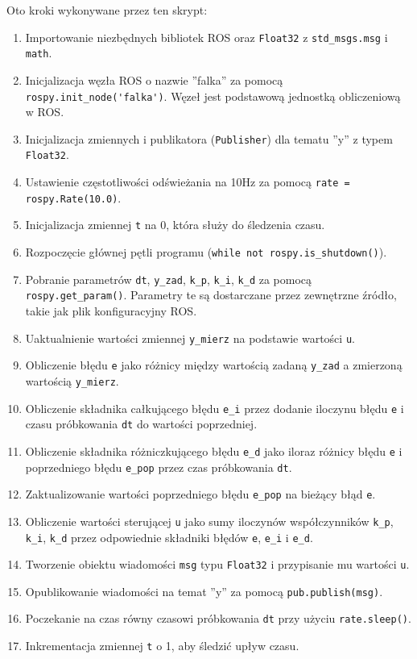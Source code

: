 \documentclass[10pt,a4paper,twoside,twocolumn]{article}%
\begin{document}
Oto kroki wykonywane przez ten skrypt:

\begin{enumerate}
    \item Importowanie niezbędnych bibliotek ROS oraz \verb|Float32| z \verb|std_msgs.msg| i \verb|math|.
    \item Inicjalizacja węzła ROS o nazwie ''falka'' za pomocą \verb|rospy.init_node('falka')|. Węzeł jest podstawową jednostką obliczeniową w ROS.
    \item Inicjalizacja zmiennych i publikatora (\verb|Publisher|) dla tematu ''y'' z typem \verb|Float32|.
    \item Ustawienie częstotliwości odświeżania na 10Hz za pomocą \verb|rate = rospy.Rate(10.0)|.
    \item Inicjalizacja zmiennej \verb|t| na 0, która służy do śledzenia czasu.
    \item Rozpoczęcie głównej pętli programu (\verb|while not rospy.is_shutdown()|).
    \item Pobranie parametrów \verb|dt|, \verb|y_zad|, \verb|k_p|, \verb|k_i|, \verb|k_d| za pomocą \verb|rospy.get_param()|. Parametry te są dostarczane przez zewnętrzne źródło, takie jak plik konfiguracyjny ROS.
    \item Uaktualnienie wartości zmiennej \verb|y_mierz| na podstawie wartości \verb|u|.
    \item Obliczenie błędu \verb|e| jako różnicy między wartością zadaną \verb|y_zad| a zmierzoną wartością \verb|y_mierz|.
    \item Obliczenie składnika całkującego błędu \verb|e_i| przez dodanie iloczynu błędu \verb|e| i czasu próbkowania \verb|dt| do wartości poprzedniej.
    \item Obliczenie składnika różniczkującego błędu \verb|e_d| jako iloraz różnicy błędu \verb|e| i poprzedniego błędu \verb|e_pop| przez czas próbkowania \verb|dt|.
    \item Zaktualizowanie wartości poprzedniego błędu \verb|e_pop| na bieżący błąd \verb|e|.
    \item Obliczenie wartości sterującej \verb|u| jako sumy iloczynów współczynników \verb|k_p|, \verb|k_i|, \verb|k_d| przez odpowiednie składniki błędów \verb|e|, \verb|e_i| i \verb|e_d|.
    \item Tworzenie obiektu wiadomości \verb|msg| typu \verb|Float32| i przypisanie mu wartości \verb|u|.
    \item Opublikowanie wiadomości na temat ''y'' za pomocą \verb|pub.publish(msg)|.
    \item Poczekanie na czas równy czasowi próbkowania \verb|dt| przy użyciu \verb|rate.sleep()|.
    \item Inkrementacja zmiennej \verb|t| o 1, aby śledzić upływ czasu.
\end{enumerate}
\end{document}
